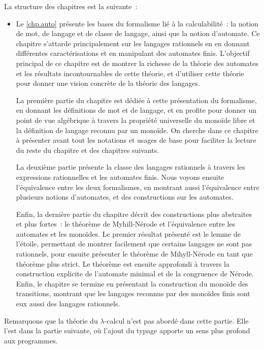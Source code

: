 La structure des chapitres est la suivante~:
\begin{itemize}
\item Le \cref{chp.auto} présente les bases du formalisme lié à la
  calculabilité~: la notion de mot, de langage et de classe de langage, ainsi
  que la notion d'automate. Ce chapitre s'attarde principalement sur les
  langages rationnels en en donnant différentes caractérisations et en
  manipulant des automates finis. L'objectif principal de ce chapitre est de
  montrer la richesse de la théorie des automates et les résultats
  incontournables de cette théorie, et d'utiliser cette théorie pour donner une
  vision concrète de la théorie des langages.

  La première partie du chapitre est dédiée à cette présentation du formalisme,
  en donnant les définitions de mot et de langage, et en profite pour donner un
  point de vue algébrique à travers la propriété universelle du monoïde libre et
  la définition de langage reconnu par un monoïde. On cherche dans ce chapitre à
  présenter avant tout les notations et usages de base pour faciliter la lecture
  du reste du chapitre et des chapitres suivants.

  La deuxième partie présente la classe des langages rationnels à travers les
  expressions rationnelles et les automates finis. Nous voyons ensuite
  l'équivalence entre les deux formalismes, en montrant aussi l'équivalence
  entre plusieurs notions d'automates, et des constructions sur les automates.

  Enfin, la dernière partie du chapitre décrit des constructions plus abstraites
  et plus fortes~: le théorème de Myhill-Nérode et l'équivalence entre les
  automates et les monoïdes. Le premier résultat présenté est le lemme de
  l'étoile, permettant de montrer facilement que certains langages ne sont pas
  rationnels, pour ensuite présenter le théorème de Mihyll-Nérode en tant que
  théorème plus strict. Le théorème est ensuite approfondi à travers la
  construction explicite de l'automate minimal et de la congruence de Nérode.
  Enfin, le chapitre se termine en présentant la construction du monoïde des
  transitions, montrant que les langages reconnus par des monoïdes finis sont
  eux aussi des langages rationnels.
\end{itemize}

Remarquons que la théorie du $\lambda$-calcul n'est pas abordé dans cette
partie. Elle l'est dans la partie suivante, où l'ajout du typage apporte un
sens plus profond aux programmes.


